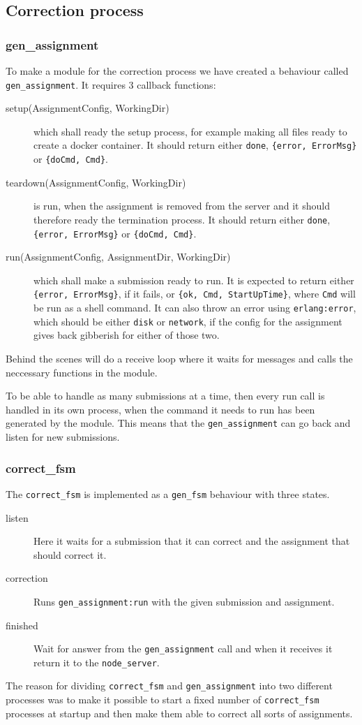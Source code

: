 \subsection{Correction process}



\subsubsection{gen\_assignment}
To make a module for the correction process we have created a behaviour called
\texttt{gen\_assignment}. It requires 3 callback functions:
\begin{description}
    \item[setup(AssignmentConfig, WorkingDir)] which shall ready the setup
    process, for example making all files ready to create a docker container.
    It should return either \texttt{done}, \texttt{\{error, ErrorMsg\}} or
    \texttt{\{doCmd, Cmd\}}.
    \item[teardown(AssignmentConfig, WorkingDir)] is run, when the assignment is
    removed from the server and it should therefore ready the termination
    process. It should return either \texttt{done}, \texttt{\{error, ErrorMsg\}}
    or \texttt{\{doCmd, Cmd\}}.
    \item[run(AssignmentConfig, AssignmentDir, WorkingDir)] which shall make a
    submission ready to run. It is expected to return either
    \texttt{\{error, ErrorMsg\}}, if it fails, or
    \texttt{\{ok, Cmd, StartUpTime\}}, where \texttt{Cmd} will be run as a shell
    command. It can also throw an error using \texttt{erlang:error}, which
    should be either \texttt{disk} or \texttt{network}, if the config for the
    assignment gives back gibberish for either of those two.
\end{description}

Behind the scenes  will do a receive loop where it waits
for messages and calls the neccessary functions in the module.

To be able to handle as many submissions at a time, then every run call is
handled in its own process, when the command it needs to run has been generated
by the module. This means that the \texttt{gen\_assignment} can go back and
listen for new submissions.

\subsubsection{correct\_fsm}
The \texttt{correct\_fsm} is implemented as a \texttt{gen_fsm} behaviour with
three states.
\begin{description}
    \item[listen] Here it waits for a submission that it can correct and the
    assignment that should correct it.
    \item[correction] Runs \texttt{gen\_assignment:run} with the given
    submission and assignment.
    \item[finished] Wait for answer from the \texttt{gen\_assignment} call and
    when it receives it return it to the \texttt{node\_server}.
\end{description}

The reason for dividing \texttt{correct\_fsm} and \texttt{gen\_assignment} into
two different processes was to make it possible to start a fixed number of
\texttt{correct\_fsm} processes at startup and then make them able to correct
all sorts of assignments.
